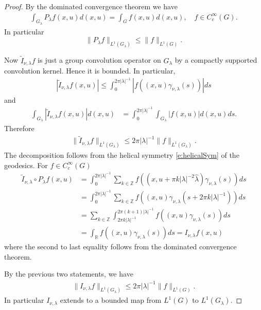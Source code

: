 \documentclass[11pt]{amsart}
\theoremstyle{plain}
\theoremstyle{definition}
\theoremstyle{remark}
\numberwithin{equation}{section}
\def\R{{\mathbb R}}%
\numberwithin{equation}{section}
\begin{document}
\begin{proof}
	By the dominated convergence theorem we have
	\begin{align*}
		\int_{G_{\lambda}}P_{\lambda}f(x, u)d(x, u)=\int_G f(x, u)d(x, u), \quad f\in C_c^\infty(G).
	\end{align*}
	In particular $$\|P_{\lambda}f\|_{L^1(G_{\lambda})}\leq \|f\|_{L^1(G)}.$$
	
	Now $\widetilde{I}_{\nu, \lambda}f$ is just a group convolution operator on $G_{\lambda}$ by a compactly supported convolution kernel. Hence it is bounded. In particular, 
	\begin{align*}
		|\widetilde{I}_{\nu, \lambda}f(x, u)|\leq \int_0^{2\pi |\lambda|^{-1}}|f\left((x, u)\gamma_{\nu, \lambda}(s)\right)|ds
	\end{align*}
	and 
	\begin{align*}
		\int_{G_\lambda}|\widetilde{I}_{\nu, \lambda} f(x, u)|d(x, u)
		&=\int_0^{2\pi |\lambda|^{-1}} \int_{G_\lambda}|f\left(x, u\right)|d(x, u)ds.
	\end{align*}
	Therefore
	\begin{align*}
		\|\widetilde{I}_{\nu, \lambda} f\|_{L^1(G_\lambda)}\leq 2\pi  |\lambda|^{-1}\|f\|_{L^1(G_{\lambda})}.
	\end{align*}
	The decomposition follows from the helical symmetry \eqref{e:helicalSym} of the geodesics. For $f\in C_c^\infty(G)$ 
	\begin{align*}
		\widetilde{I}_{\nu, \lambda}\circ P_{\lambda}f(x, u)
		&=\int_0^{2\pi  |\lambda|^{-1}}\sum_{k\in\mathbb{Z}}f\left((x, u+\pi k|\lambda|^{-2}\hat{\lambda})\gamma_{\nu, \lambda}(s)\right)ds\\
		&=\int_0^{2\pi  |\lambda|^{-1}}\sum_{k\in\mathbb{Z}}f\left((x, u)\gamma_{\nu, \lambda}(s+2\pi k|\lambda|^{-1})\right)ds	\\
		&=\sum_{k\in\mathbb{Z}}\int_{2\pi k |\lambda|^{-1}}^{2\pi (k+1) |\lambda|^{-1}}f\left((x, u)\gamma_{\nu, \lambda}(s)\right)ds	\\
		&=\int_\R f\left((x, u)\gamma_{\nu, \lambda}(s)\right)ds=I_{\nu, \lambda}f(x, u)
	\end{align*}
	where the second to last equality follows from the dominated convergence theorem. 
	
	By the previous two statements, we have
	\begin{align*}
		\| I_{\nu, \lambda} f\|_{L^1(G_\lambda)}\leq 2\pi |\lambda|^{-1}\|f\|_{L^1(G)}.
	\end{align*}
	In particular $I_{\nu, \lambda}$ extends to a bounded map from $L^1(G)$ to $L^1(G_\lambda)$. 
\end{proof}
\end{document}

